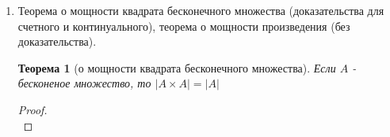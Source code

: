 \documentclass[a4paper]{article}
\newtheorem*{theorem*}{Теорема}
\newtheorem*{lemma*}{Лемма}
\theoremstyle{definition}
\begin{document}
\begin{enumerate}
\begin{proof}
\begin{enumerate}
               $h_{1}(<x;y>)=<f(x),g(y)>$.
                Легко проверить, что $h_{1}$ - нужная биекция.
         \item Построим $h_{2} : A\cup B \xrightarrow[\text{на}]{1-1}A_{1}\cup B_{1}$ так:
               $h_{2}(x) =
                \left\{
                \begin{matrix}
                 f(x)\text{, если } x \in A \\
                 g(x)\text{, если } x \in B \\
                \end{matrix}
                \right.$
               Условие $A \cap B = \emptyset$ гарантирует, что определение корректно.
               Вновь нетрудно доказать, что $h_{2}$ - биекция. Проверим в качестве примера, что $h_{2}$ инъективна. Пусть $h_{2}(x)=h_{2}(y)$. Если $x,y \in A$, то получаем $f(x)=f(y)$ и $x=y$. Если $x,y \in B$, рассуждения аналогичны. Если же $x \in A, y \in B$  (или наоборот), то $h_{2}(x) \in A_{1}$ и $h_{2}(y) \in B_{1}$, что невозможно в силу $A_{1} \cap B_{2} = \emptyset$.
        \end{enumerate}
       \end{proof}
       \begin{lemma*}[о мощности объединения] Если хотя бы одно из множеств $A,B$ бесконечно, то $\left | A \cup B \right | = max\{\left | A \right |,\left | B \right |\}$.
       \end{lemma*}
 \item Теорема о мощности квадрата бесконечного множества (доказательства для счетного и континуального), теорема о мощности произведения (без доказательства).
       \begin{theorem*}[о мощности квадрата бесконечного множества]
        Если $A$ - бесконеное множество, то $|A\times{A}|=|A|$
       \end{theorem*}
       \begin{proof}\mbox{}\\
\end{proof}
\end{enumerate}
\end{document}
